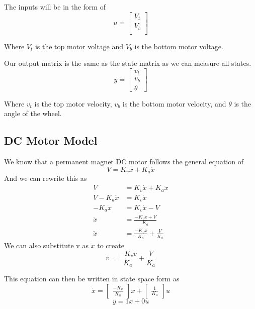 \documentclass{scrartcl}
\begin{document}
The inputs will be in the form of
\begin{equation}
    u =
    \begin{bmatrix}
        V_t \\
        V_b \\
    \end{bmatrix}
\end{equation}

Where \(V_t\) is the top motor voltage and \(V_b\) is the bottom motor voltage.

Our output matrix is the same as the state matrix as we can measure all states.
\begin{equation}
    y =
    \begin{bmatrix}
        v_t \\
        v_b \\
        \theta
    \end{bmatrix}
\end{equation}

Where \(v_t\) is the top motor velocity, \(v_b\) is the bottom motor velocity, and \(\theta\) is the angle of the wheel.

\subsection{DC Motor Model}
We know that a permanent magnet DC motor follows the general equation of
\begin{equation}
    V = K_v\dot{x} + K_a\ddot{x}
\end{equation}
And we can rewrite this as
\begin{align*}
    V               & = K_v\dot{x} + K_a\ddot{x}                \\
    V - K_a\ddot{x} & = K_v\dot{x}                              \\
    -K_a\ddot{x}    & = K_v\dot{x} - V                          \\
    \ddot{x}        & = \frac{-K_v\dot{x} + V}{K_a}             \\
    \ddot{x}        & = \frac{-K_v\dot{x}}{K_a} + \frac{V}{K_a}
\end{align*}
We can also substitute v as \(\dot{x}\) to create
\begin{equation}
    \dot{v} = \frac{-K_v v}{K_a} + \frac{V}{K_a}
\end{equation}

This equation can then be written in state space form as
\begin{equation}
    \dot{x} = \begin{bmatrix}\frac{-K_v}{K_a}\end{bmatrix}x + \begin{bmatrix}\frac{1}{K_a}\end{bmatrix}u
\end{equation}
\begin{equation}
    y = 1x + 0u
\end{equation}
\end{document}
